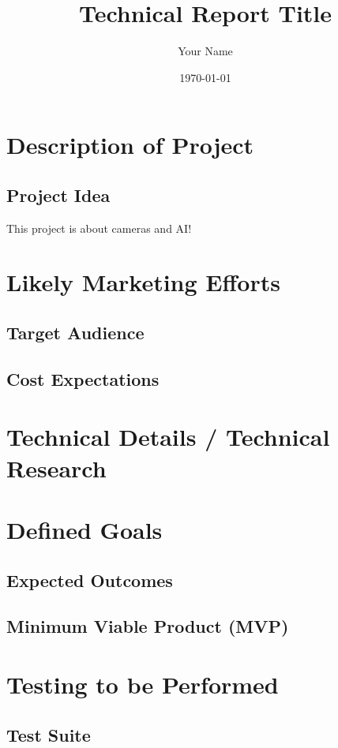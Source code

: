\documentclass{report}
\title{Technical Report Title}
\author{Your Name}
\date{\today}
\begin{document}
\maketitle

\tableofcontents
\newpage

\chapter{Description of Project}
\section{Project Idea}
This project is about cameras and AI!

\chapter{Likely Marketing Efforts}
\section{Target Audience}
\lipsum[3]
\section{Cost Expectations}
\lipsum[4]

\chapter{Technical Details / Technical Research}
\lipsum[5—6]

\chapter{Defined Goals}
\section{Expected Outcomes}
\lipsum[7]
\section{Minimum Viable Product (MVP)}
\lipsum[8]

\chapter{Testing to be Performed}
\section{Test Suite}
\lipsum[9]
\end{document}

